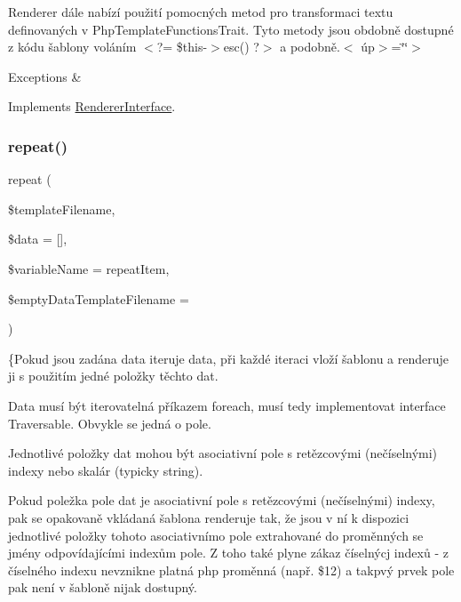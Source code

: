 Renderer dále nabízí použití pomocných metod pro transformaci textu definovaných v Php\+Template\+Functions\+Trait. Tyto metody jsou obdobně dostupné z kódu šablony voláním {\ttfamily $<$?= \$this-\/$>$esc() ?$>$} a podobně.$<$ úp$>$=\char`\"{}\char`\"{}$>$


\begin{DoxyExceptions}{Exceptions}
{\em } & \\
\hline
\end{DoxyExceptions}


Implements \mbox{\hyperlink{interface_pes_1_1_view_1_1_renderer_1_1_renderer_interface_ab273a8d7deb9bb9235161c4f8419e402}{Renderer\+Interface}}.

\mbox{\label{class_pes_1_1_view_1_1_renderer_1_1_php_renderer_a59c2c3bcc551a9d1ccf3b49224c985e3}} 
\subsubsection{\texorpdfstring{repeat()}{repeat()}}
{\footnotesize\ttfamily repeat (\begin{DoxyParamCaption}\item[{}]{\$template\+Filename,  }\item[{}]{\$data = {\ttfamily \mbox{[}\mbox{]}},  }\item[{}]{\$variable\+Name = {\ttfamily \textquotesingle{}repeatItem\textquotesingle{}},  }\item[{}]{\$empty\+Data\+Template\+Filename = {\ttfamily \textquotesingle{}\textquotesingle{}} }\end{DoxyParamCaption})}

\{Pokud jsou zadána data iteruje data, při každé iteraci vloží šablonu a renderuje ji s použitím jedné položky těchto dat.

Data musí být iterovatelná příkazem foreach, musí tedy implementovat interface Traversable. Obvykle se jedná o pole. 

Jednotlivé položky dat mohou být asociativní pole s retězcovými (nečíselnými) indexy nebo skalár (typicky string). 

Pokud poležka pole dat je asociativní pole s retězcovými (nečíselnými) indexy, pak se opakovaně vkládaná šablona renderuje tak, že jsou v ní k dispozici jednotlivé položky tohoto asociativnímo pole extrahované do proměnných se jmény odpovídajícími indexům pole. Z toho také plyne zákaz číselnýcj indexů -\/ z číselného indexu nevznikne platná php proměnná (např. \$12) a takpvý prvek pole pak není v šabloně nijak dostupný. 

